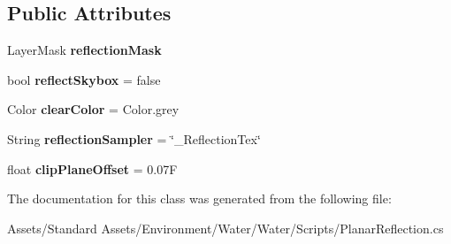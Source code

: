 \subsection*{Public Attributes}
\begin{DoxyCompactItemize}
\item 
Layer\+Mask {\bfseries reflection\+Mask}\hypertarget{class_unity_standard_assets_1_1_water_1_1_planar_reflection_a9dc798eef2279794ab2d34242810a628}{}\label{class_unity_standard_assets_1_1_water_1_1_planar_reflection_a9dc798eef2279794ab2d34242810a628}

\item 
bool {\bfseries reflect\+Skybox} = false\hypertarget{class_unity_standard_assets_1_1_water_1_1_planar_reflection_ac9d2d7b456df4e66601c899f34520dce}{}\label{class_unity_standard_assets_1_1_water_1_1_planar_reflection_ac9d2d7b456df4e66601c899f34520dce}

\item 
Color {\bfseries clear\+Color} = Color.\+grey\hypertarget{class_unity_standard_assets_1_1_water_1_1_planar_reflection_ae538e3cf0771e8fe2b0b750e1b709f29}{}\label{class_unity_standard_assets_1_1_water_1_1_planar_reflection_ae538e3cf0771e8fe2b0b750e1b709f29}

\item 
String {\bfseries reflection\+Sampler} = \char`\"{}\+\_\+\+Reflection\+Tex\char`\"{}\hypertarget{class_unity_standard_assets_1_1_water_1_1_planar_reflection_a1677dea47658aae145100204e24cf51f}{}\label{class_unity_standard_assets_1_1_water_1_1_planar_reflection_a1677dea47658aae145100204e24cf51f}

\item 
float {\bfseries clip\+Plane\+Offset} = 0.\+07F\hypertarget{class_unity_standard_assets_1_1_water_1_1_planar_reflection_a37ace0a55e4c59c794795f8d610c4afe}{}\label{class_unity_standard_assets_1_1_water_1_1_planar_reflection_a37ace0a55e4c59c794795f8d610c4afe}

\end{DoxyCompactItemize}


The documentation for this class was generated from the following file\+:\begin{DoxyCompactItemize}
\item 
Assets/\+Standard Assets/\+Environment/\+Water/\+Water/\+Scripts/Planar\+Reflection.\+cs\end{DoxyCompactItemize}
